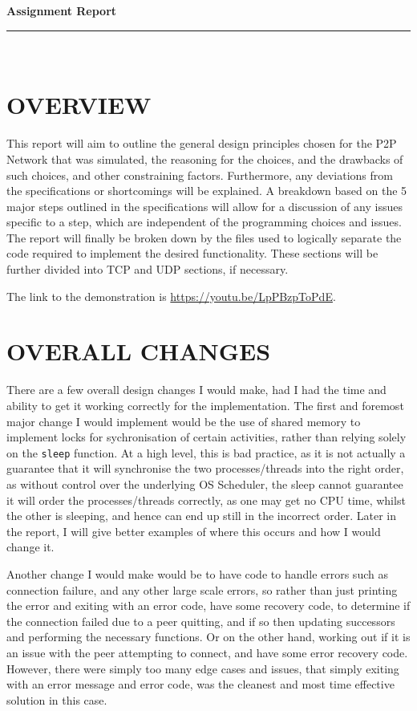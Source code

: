 \documentclass[a4paper,11pt]{article}
\newcommand{\code}{\texttt}
\newcommand{\HRule}{\rule{\linewidth}{0.5mm}} %
\begin{document}
\begin{center}
	\LARGE \textbf{Assignment Report}
	\HRule\\
\end{center}


\section{OVERVIEW}
This report will aim to outline the general design principles chosen for the P2P Network that was simulated, the reasoning for the choices, and the drawbacks of such choices, and other constraining factors. Furthermore, any deviations from the specifications or shortcomings will be explained. A breakdown based on the 5 major steps outlined in the specifications will allow for a discussion of any issues specific to a step, which are independent of the programming choices and issues. The report will finally be broken down by the files used to logically separate the code required to implement the desired functionality. These sections will be further divided into TCP and UDP sections, if necessary. 

\bigbreak

\noindent The link to the demonstration is \url{https://youtu.be/LpPBzpToPdE}.

\bigbreak

\section{OVERALL CHANGES}
There are a few overall design changes I would make, had I had the time and ability to get it working correctly for the implementation. The first and foremost major change I would implement would be the use of shared memory to implement locks for sychronisation of certain activities, rather than relying solely on the \code{sleep} function. At a high level, this is bad practice, as it is not actually a guarantee that it will synchronise the two processes/threads into the right order, as without control over the underlying OS Scheduler, the sleep cannot guarantee it will order the processes/threads correctly, as one may get no CPU time, whilst the other is sleeping, and hence can end up still in the incorrect order. Later in the report, I will give better examples of where this occurs and how I would change it. 

\bigbreak

\noindent Another change I would make would be to have code to handle errors such as connection failure, and any other large scale errors, so rather than just printing the error and exiting with an error code, have some recovery code, to determine if the connection failed due to a peer quitting, and if so then updating successors and performing the necessary functions. Or on the other hand, working out if it is an issue with the peer attempting to connect, and have some error recovery code. However, there were simply too many edge cases and issues, that simply exiting with an error message and error code, was the cleanest and most time effective solution in this case.
\end{document}
